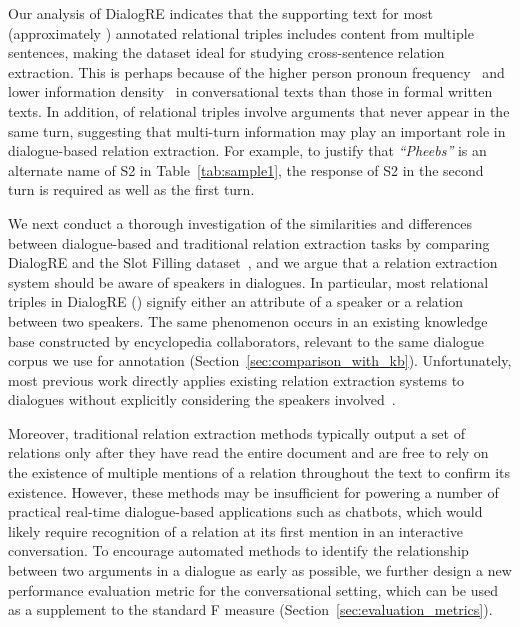 \documentclass[11pt,a4paper]{article}
\begin{document}
Our analysis of DialogRE indicates that the supporting text for most (approximately ) annotated relational triples includes content from multiple sentences, making the dataset ideal for studying cross-sentence relation extraction. This is perhaps because of the higher person pronoun frequency~\cite{biber1991variation} and lower information density~\cite{wang-liu-2011-summarization} in conversational texts than those in formal written texts. In addition,  of relational triples involve arguments that never appear in the same turn, suggesting that multi-turn information may play an important role in dialogue-based relation extraction. For example, to justify that \emph{``Pheebs''} is an alternate name of S2 in Table~\ref{tab:sample1}, the response of S2 in the second turn is required as well as the first turn.



We next conduct a thorough investigation of the similarities and differences between dialogue-based and traditional relation extraction tasks by comparing DialogRE and the Slot Filling dataset~\cite{mcnamee2009overview,ji2010overview,ji2011overview,surdeanu2013overview,surdeanu2014overview}, and we argue that a relation extraction system should be aware of speakers in dialogues. In particular, most relational triples in DialogRE () signify either an attribute of a speaker or a relation between two speakers. The same phenomenon occurs in an existing knowledge base constructed by encyclopedia collaborators, relevant to the same dialogue corpus we use for annotation (Section~\ref{sec:comparison_with_kb}). Unfortunately, most previous work directly applies existing relation extraction systems to dialogues without explicitly considering the speakers involved~\cite{yoshino-2011-spoken,wang-cardie-2012}.  




Moreover, traditional relation extraction methods typically output a set of relations only after they have read the entire document and are free to rely on the existence of multiple mentions of a relation throughout the text to confirm its existence. However, these methods may be insufficient for powering a number of practical real-time dialogue-based applications such as chatbots, which would likely require recognition of a relation at its first mention in an interactive conversation. To encourage automated methods to identify the relationship between two arguments in a dialogue as early as possible, we further design a new performance evaluation metric for the conversational setting, which can be used as a supplement to the standard F measure (Section~\ref{sec:evaluation_metrics}). 
\end{document}
